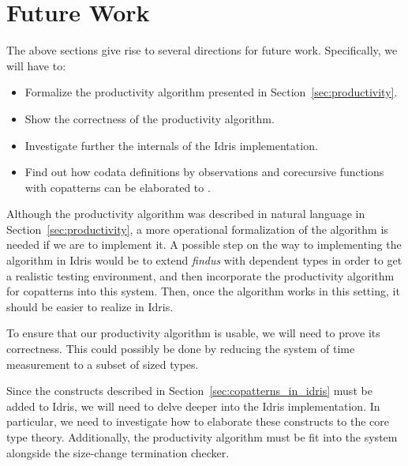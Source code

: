 \section{Future Work}
\label{sec:future_work}
The above sections give rise to several directions for future work. Specifically, we will have to:
\begin{itemize}
\item Formalize the productivity algorithm presented in Section~\ref{sec:productivity}.
\item Show the correctness of the productivity algorithm.
\item Investigate further the internals of the Idris implementation.
\item Find out how codata definitions by observations and corecursive functions with copatterns can be elaborated to \TT.
\end{itemize}
Although the productivity algorithm was described in natural language in Section~\ref{sec:productivity}, a more operational formalization of the algorithm is needed if we are to implement it. A possible step on the way to implementing the algorithm in Idris would be to extend \textit{findus} with dependent types in order to get a realistic testing environment, and then incorporate the productivity algorithm for copatterns into this system. Then, once the algorithm works in this setting, it should be easier to realize in Idris.

To ensure that our productivity algorithm is usable, we will need to prove its correctness. This could possibly be done by reducing the system of time measurement to a subset of sized types.

Since the constructs described in Section~\ref{sec:copatterns_in_idris} must be added to Idris, we will need to delve deeper into the Idris implementation. In particular, we need to investigate how to elaborate these constructs to the core type theory. Additionally, the productivity algorithm must be fit into the system alongside the size-change termination checker.
